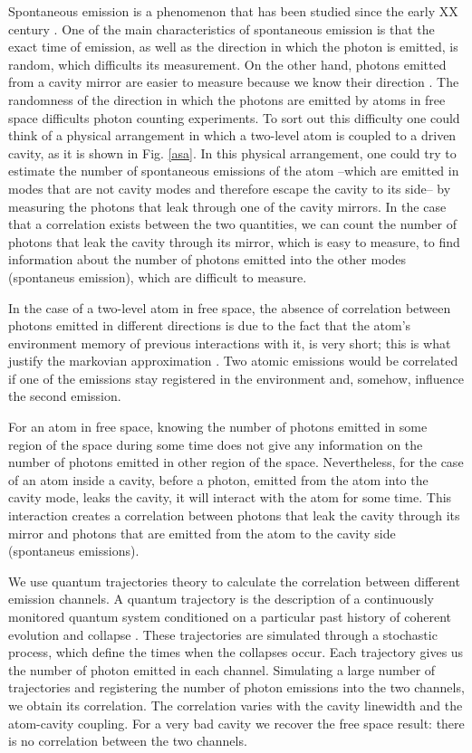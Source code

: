 \documentclass[%
 reprint,
 amsmath,amssymb,
 aps, 
]{revtex4-1}
\begin{document}
Spontaneous emission is a phenomenon that has been studied since the
early XX century \cite{10.2307/94746, 1917PhyZ...18..121E}. One of the
main characteristics of spontaneous emission is that the exact time of
emission, as well as the direction in which the photon is emitted, is
random, which difficults its measurement. On the other hand, photons
emitted from a cavity mirror are easier to measure because we know
their direction \cite{326305, doi:10.1063/1.113345}. The randomness of
the direction in which the photons are emitted by atoms in free space
difficults photon counting experiments. To sort out this difficulty
one could think of a physical arrangement in which a two-level atom is
coupled to a driven cavity, as it is shown in Fig. \ref{asa}. In this
physical arrangement, one could try to estimate the number of
spontaneous emissions of the atom --which are emitted in modes that
are not cavity modes and therefore escape the cavity to its side-- by
measuring the photons that leak through one of the cavity mirrors. In
the case that a correlation exists between the two quantities, we can
count the number of photons that leak the cavity through its mirror,
which is easy to measure, to find information about the number of
photons emitted into the other modes (spontaneus emission), which are
difficult to measure.

In the case of a two-level atom in free space, the absence of
correlation between photons emitted in different directions is due to
the fact that the atom's environment memory of previous interactions
with it, is very short; this is what justify the markovian
approximation \cite{daley2014quantum}. Two atomic emissions would be
correlated if one of the emissions stay registered in the environment
and, somehow, influence the second emission.

For an atom in free space, knowing the number of photons emitted in
some region of the space during some time does not give any
information on the number of photons emitted in other region of the
space. Nevertheless, for the case of an atom inside a cavity, before a
photon, emitted from the atom into the cavity mode, leaks the cavity,
it will interact with the atom for some time. This interaction creates
a correlation between photons that leak the cavity through its mirror
and photons that are emitted from the atom to the cavity side
(spontaneus emissions).

We use quantum trajectories theory to calculate the correlation between
different emission channels. A quantum trajectory is the description
of a continuously monitored quantum system conditioned on a particular
past history of coherent evolution and collapse
\cite{Carmichael1993Open}. These trajectories are simulated through a
stochastic process, which define the times when the collapses occur.
Each trajectory gives us the number of photon emitted in each channel.
Simulating a large number of trajectories and registering the number
of photon emissions into the two channels, we obtain its correlation.
The correlation varies with the cavity linewidth and the atom-cavity
coupling. For a very bad cavity we recover the free space result:
there is no correlation between the two channels.
\end{document}
